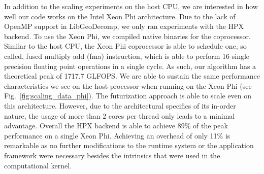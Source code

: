\documentclass{sig-alternate}
\newcommand{\B}[1]{\textbf{#1}}
\newcommand{\F}[1]{\B{\textcolor{red}{FIXME: #1}}}
\newcommand{\upp}{\vspace*{-0.5em}}
\newcommand{\up}{\vspace*{-0.25em}}
\begin{document}
In addition to the scaling experiments on the host CPU, we are interested in how
well our code works on the Intel Xeon Phi architecture. Due to the lack of OpenMP
support in LibGeoDecomp, we only ran experiments with the HPX backend. To use the
Xeon Phi, we compiled native binaries for the coprocessor. Similar to the host
CPU, the Xeon Phi coprocessor is able to schedule one, so called, fused multiply
add (fma) instruction, which is able to perform 16 single precision floating
point operations in a single cycle. As such, our algorithm has a theoretical peak
of 1717.7 GLFOPS.
We are able to sustain the same performance characteristics we see on the host
processor when running on the Xeon Phi (see Fig.~\ref{fig:scaling_data_phi}). The
futurization approach is able to scale even on this architecture. However, due to
the architectural specifics of its in-order nature, the usage of more than 2 cores
per thread only leads to a minimal advantage. Overall the HPX backend is
able to achieve 89\% of the peak performance on a single Xeon Phi.
Achieving an overhead of only 11\% is remarkable as no
further modifications to the runtime system or the application framework
were necessary besides the intrinsics that were used in the computational kernel.
\end{document}
